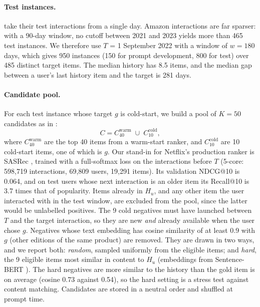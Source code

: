 \documentclass[11pt]{article}
\begin{document}
\paragraph{Test instances.} \citet{li2026llmreasoning} take their test interactions from a single day. Amazon interactions are far sparser: with a 90-day window, no cutoff between 2021 and 2023 yields more than 465 test instances. We therefore use $T$ = 1 September 2022 with a window of $w = 180$ days, which gives 950 instances (150 for prompt development, 800 for test) over 485 distinct target items. The median history has 8.5 items, and the median gap between a user's last history item and the target is 281 days.

\paragraph{Candidate pool.} For each test instance whose target $g$ is cold-start, we build a pool of $K = 50$ candidates as in \citet{li2026llmreasoning}:
\begin{equation}
  C = C^{\text{warm}}_{40} \;\cup\; C^{\text{cold}}_{10},
\end{equation}
where $C^{\text{warm}}_{40}$ are the top 40 items from a warm-start ranker, and $C^{\text{cold}}_{10}$ are 10 cold-start items, one of which is $g$. Our stand-in for Netflix's production ranker is SASRec \citep{kang2018sasrec}, trained with a full-softmax loss on the interactions before $T$ (5-core: 598,719 interactions, 69,809 users, 19,291 items). Its validation NDCG@10 is 0.064, and on test users whose next interaction is an older item its Recall@10 is 3.7 times that of popularity. Items already in $H_u$, and any other item the user interacted with in the test window, are excluded from the pool, since the latter would be unlabelled positives. The 9 cold negatives must have launched between $T$ and the target interaction, so they are new \emph{and} already available when the user chose $g$. Negatives whose text embedding has cosine similarity of at least 0.9 with $g$ (other editions of the same product) are removed. They are drawn in two ways, and we report both: \emph{random}, sampled uniformly from the eligible items; and \emph{hard}, the 9 eligible items most similar in content to $H_u$ (embeddings from Sentence-BERT \citep{reimers2019sbert}). The hard negatives are more similar to the history than the gold item is on average (cosine 0.73 against 0.54), so the hard setting is a stress test against content matching. Candidates are stored in a neutral order and shuffled at prompt time.
\end{document}
